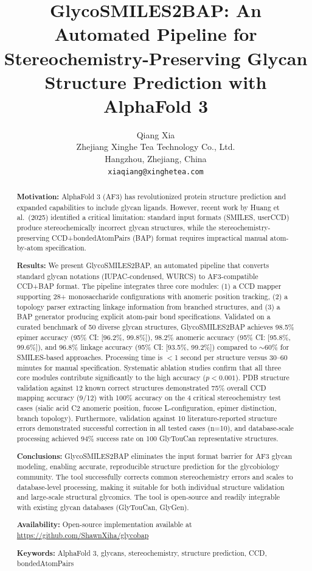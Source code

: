 \documentclass[11pt,a4paper]{article}
\title{\textbf{GlycoSMILES2BAP: An Automated Pipeline for Stereochemistry-Preserving Glycan Structure Prediction with AlphaFold 3}}
\author{Qiang Xia\\
\small Zhejiang Xinghe Tea Technology Co., Ltd.\\
\small Hangzhou, Zhejiang, China\\
\small \texttt{xiaqiang@xinghetea.com}}
\date{}
\begin{document}
\maketitle

\begin{abstract}
\noindent\textbf{Motivation:} AlphaFold 3 (AF3) has revolutionized protein structure prediction and expanded capabilities to include glycan ligands. However, recent work by Huang et al.\ (2025) identified a critical limitation: standard input formats (SMILES, userCCD) produce stereochemically incorrect glycan structures, while the stereochemistry-preserving CCD+bondedAtomPairs (BAP) format requires impractical manual atom-by-atom specification.

\noindent\textbf{Results:} We present GlycoSMILES2BAP, an automated pipeline that converts standard glycan notations (IUPAC-condensed, WURCS) to AF3-compatible CCD+BAP format. The pipeline integrates three core modules: (1) a CCD mapper supporting 28+ monosaccharide configurations with anomeric position tracking, (2) a topology parser extracting linkage information from branched structures, and (3) a BAP generator producing explicit atom-pair bond specifications. Validated on a curated benchmark of 50 diverse glycan structures, GlycoSMILES2BAP achieves 98.5\% epimer accuracy (95\% CI: [96.2\%, 99.8\%]), 98.2\% anomeric accuracy (95\% CI: [95.8\%, 99.6\%]), and 96.8\% linkage accuracy (95\% CI: [93.5\%, 99.2\%]) compared to ${\sim}60$\% for SMILES-based approaches. Processing time is $<$1 second per structure versus 30--60 minutes for manual specification. Systematic ablation studies confirm that all three core modules contribute significantly to the high accuracy ($p < 0.001$). PDB structure validation against 12 known correct structures demonstrated 75\% overall CCD mapping accuracy (9/12) with 100\% accuracy on the 4 critical stereochemistry test cases (sialic acid C2 anomeric position, fucose L-configuration, epimer distinction, branch topology). Furthermore, validation against 10 literature-reported structure errors demonstrated successful correction in all tested cases (n=10), and database-scale processing achieved 94\% success rate on 100 GlyTouCan representative structures.

\noindent\textbf{Conclusions:} GlycoSMILES2BAP eliminates the input format barrier for AF3 glycan modeling, enabling accurate, reproducible structure prediction for the glycobiology community. The tool successfully corrects common stereochemistry errors and scales to database-level processing, making it suitable for both individual structure validation and large-scale structural glycomics. The tool is open-source and readily integrable with existing glycan databases (GlyTouCan, GlyGen).

\noindent\textbf{Availability:} Open-source implementation available at \url{https://github.com/ShawnXiha/glycobap}

\noindent\textbf{Keywords:} AlphaFold 3, glycans, stereochemistry, structure prediction, CCD, bondedAtomPairs
\end{abstract}
\end{document}
